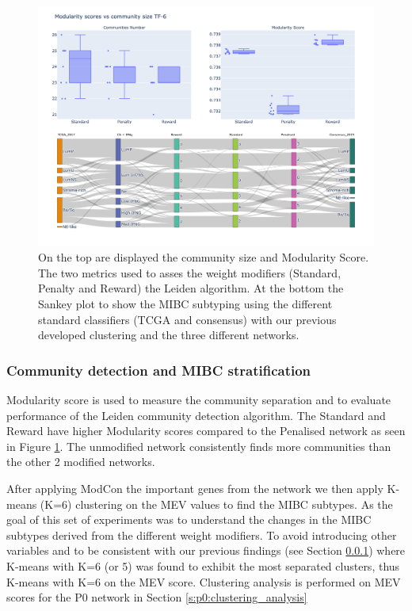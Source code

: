 \begin{figure}[!htb]    \centering\includegraphics[width=1.0\textwidth,height=0.6\textheight,keepaspectratio]{Sections/Network_I/Resources/Tum_network/LeidenMetrics_Sankey_TF-6.png}
    \caption{On the top are displayed the community size and Modularity Score. The two metrics used to asses the weight modifiers (Standard, Penalty and Reward) the Leiden algorithm. At the bottom the Sankey plot to show the MIBC subtyping using the different standard classifiers (TCGA and consensus) with our previous developed clustering and the three different networks. }
    \label{fig:N_I:tum_leiden_modifiers}
\end{figure}

\subsubsection{Community detection and MIBC stratification}

Modularity score is used to measure the community separation and to evaluate performance of the Leiden community detection algorithm. The Standard and Reward have higher Modularity scores compared to the Penalised network as seen in Figure \ref{fig:N_I:tum_leiden_modifiers}. The unmodified network consistently finds more communities than the other 2 modified networks. 


After applying ModCon the important genes from the network we then apply K-means (K=6) clustering on the MEV values to find the MIBC subtypes. As the goal of this set of experiments was to understand the changes in the MIBC subtypes derived from the different weight modifiers. To avoid introducing other variables and to be consistent with our previous findings (see Section \ref{}) where K-means with K=6 (or 5) was found to exhibit the most separated clusters, thus K-means with K=6 on the MEV score. Clustering analysis is performed on MEV scores for the P0 network in Section \ref{s:p0:clustering_analysis} 


